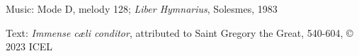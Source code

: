 


\begin{hymnsource}
Music: Mode D, melody 128; \emph{Liber Hymnarius}, Solesmes, 1983

Text: \emph{Immense cæli conditor}, attributed to Saint Gregory the Great, 540-604, © 2023 ICEL
\end{hymnsource}
